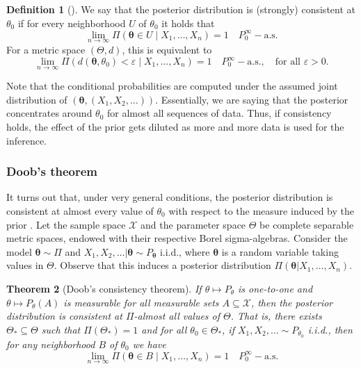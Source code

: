 \documentclass{article}
\numberwithin{equation}{section}
\theoremstyle{plain}
\newtheorem{theorem}{Theorem}
\theoremstyle{definition}
\newtheorem{definition}[theorem]{Definition}
\renewcommand{\epsilon}{\varepsilon}
\begin{document}
\begin{definition}[\citealp{ghosh2003bayesian}]
  We say that the posterior distribution is (strongly) consistent at \(\theta_0\) if for every neighborhood \(U\) of \(\theta_0\) it holds that
  \[
    \lim_{n\to\infty} \Pi(\bm\theta \in U \mid X_1, \dots,X_n) =1 \quad P_0^\infty-\text{a.s.}
  \]
  For a metric space \((\Theta, d)\), this is equivalent to
  \[
    \lim_{n\to\infty} \Pi(d(\bm \theta, \theta_0) < \epsilon \mid X_1, \dots, X_n) = 1 \quad P_0^\infty-\text{a.s.}, \quad \text{for all } \epsilon > 0.
  \]
\end{definition}

Note that the conditional probabilities are computed under the assumed joint distribution of \((\bm \theta, (X_1, X_2,\dots))\). Essentially, we are saying that the posterior concentrates around \(\theta_0\) for almost all sequences of data. Thus, if consistency holds, the effect of the prior gets diluted as more and more data is used for the inference.

\subsubsection*{Doob's theorem}

It turns out that, under very general conditions, the posterior distribution is consistent at almost every value of \(\theta_0\) with respect to the measure induced by the prior \citep{doob1949application}. Let the sample space \(\mathcal X\) and the parameter space \(\Theta\) be complete separable metric spaces, endowed with their respective Borel sigma-algebras. Consider the model \(\bm \theta \sim \Pi\) and \(X_1,X_2, \ldots | \bm \theta \sim P_{\bm \theta}\) i.i.d., where \(\bm\theta\) is a random variable taking values in \(\Theta\). Observe that this induces a posterior distribution \(\Pi(\bm\theta | X_1,\dots, X_n)\).

\begin{theorem}[Doob's consistency theorem]
  If \(\theta \mapsto P_\theta\) is one-to-one and \(\theta \mapsto P_\theta(A)\) is measurable for all measurable sets \(A\subseteq \mathcal X\), then the posterior distribution is consistent at \(\Pi\)-almost all values of \(\Theta\). That is, there exists \(\Theta_*\subseteq \Theta\) such that \(\Pi(\Theta_*)=1\) and for all \(\theta_0\in\Theta_*\), if \(X_1,X_2,\ldots \sim P_{\theta_0}\) i.i.d., then for any neighborhood \(B\) of \(\theta_0\) we have
  \[
    \lim_{n\to\infty} \Pi(\bm \theta \in B \mid X_1,\dots, X_n) = 1 \quad P_{0}^\infty-\text{a.s.}
  \]
\end{theorem}
\end{document}
